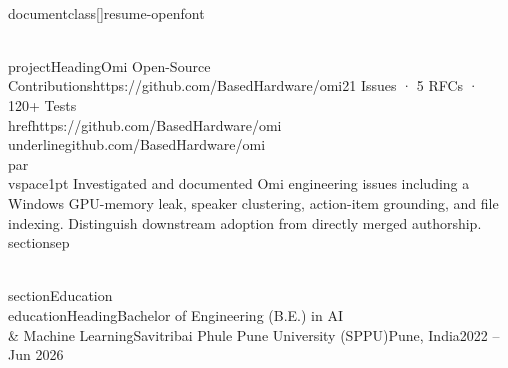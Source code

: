\\documentclass[]{resume-openfont}
\begin{document}
\\projectHeading{Omi Open-Source Contributions}{https://github.com/BasedHardware/omi}{21 Issues · 5 RFCs · 120+ Tests}
\\href{https://github.com/BasedHardware/omi}{\\underline{github.com/BasedHardware/omi}}\\par\\vspace{1pt}
Investigated and documented Omi engineering issues including a Windows GPU-memory leak, speaker clustering, action-item grounding, and file indexing. Distinguish downstream adoption from directly merged authorship.
\\sectionsep

\\section{Education}
\\educationHeading{Bachelor of Engineering (B.E.) in AI \\& Machine Learning}{Savitribai Phule Pune University (SPPU)}{Pune, India}{2022 – Jun 2026}

\
\end{document}
